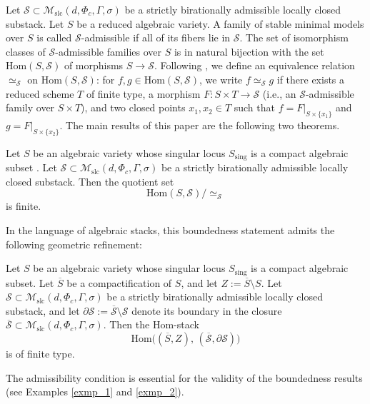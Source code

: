 \documentclass[11pt,letterpaper]{amsart}
\numberwithin{equation}{section}
\begin{document}
	Let $\mathcal{S} \subset \mathcal{M}_{\mathrm{slc}}(d, \Phi_c, \Gamma, \sigma)$ be a strictly birationally admissible locally closed substack. Let $S$ be a reduced algebraic variety. A family of stable minimal models over $S$ is called $\mathcal{S}$-admissible if all of its fibers lie in $\mathcal{S}$. The set of isomorphism classes of $\mathcal{S}$-admissible families over $S$ is in natural bijection with the set $\mathrm{Hom}(S,\mathcal{S})$ of morphisms $S \to \mathcal{S}$. Following \cite{Kovacs2011}, we define an equivalence relation $\simeq_{\mathcal{S}}$ on $\mathrm{Hom}(S,\mathcal{S})$: for $f,g \in \mathrm{Hom}(S,\mathcal{S})$, we write $f \simeq_{\mathcal{S}} g$ if there exists a reduced scheme $T$ of finite type, a morphism $F \colon S \times T \to \mathcal{S}$ (i.e., an $\mathcal{S}$-admissible family over $S \times T$), and two closed points $x_1, x_2 \in T$ such that $f = F|_{S \times \{x_1\}}$ and $g = F|_{S \times \{x_2\}}$. The main results of this paper are the following two theorems.	
	\begin{thm}\label{thm_main_set}
		Let $S$ be an algebraic variety whose singular locus $S_{\mathrm{sing}}$ is a compact algebraic subset . Let $\mathcal{S} \subset \mathcal{M}_{\mathrm{slc}}(d, \Phi_c, \Gamma, \sigma)$ be a strictly birationally admissible locally closed substack. Then the quotient set
		\[
		\mathrm{Hom}(S,\mathcal{S}) / \simeq_{\mathcal{S}}
		\]
		is finite.
	\end{thm}
	In the language of algebraic stacks, this boundedness statement admits the following geometric refinement:
	\begin{thm}\label{thm_main_Hom}
		Let $S$ be an algebraic variety whose singular locus $S_{\mathrm{sing}}$ is a compact algebraic subset. Let $\overline{S}$ be a compactification of $S$, and let $Z:=\overline{S} \setminus S$. Let $\mathcal{S} \subset \mathcal{M}_{\mathrm{slc}}(d, \Phi_c, \Gamma, \sigma)$ be a strictly birationally admissible locally closed substack, and let $\partial \mathcal{S} := \overline{\mathcal{S}} \setminus \mathcal{S}$ denote its boundary in the closure $\overline{\mathcal{S}} \subset \mathcal{M}_{\mathrm{slc}}(d, \Phi_c, \Gamma, \sigma)$. Then the Hom-stack
		\[
		\mathrm{Hom}\big((\overline{S},Z),\, (\overline{\mathcal{S}}, \partial \mathcal{S})\big)
		\]
		is of finite type.
	\end{thm}
    The admissibility condition is essential for the validity of the boundedness results (see Examples \ref{exmp_1} and \ref{exmp_2}).  
\end{document}
